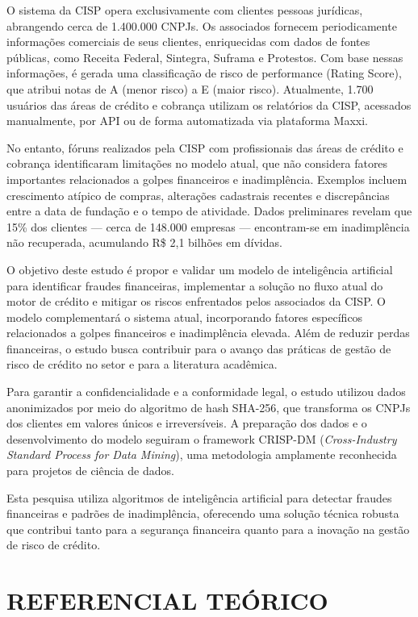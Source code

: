 \documentclass[12pt,a4paper]{article}
\begin{document}
O sistema da CISP opera exclusivamente com clientes pessoas jurídicas, abrangendo cerca de 1.400.000 CNPJs. Os associados fornecem periodicamente informações comerciais de seus clientes, enriquecidas com dados de fontes públicas, como Receita Federal, Sintegra, Suframa e Protestos. Com base nessas informações, é gerada uma classificação de risco de performance (Rating Score), que atribui notas de A (menor risco) a E (maior risco). Atualmente, 1.700 usuários das áreas de crédito e cobrança utilizam os relatórios da CISP, acessados manualmente, por API ou de forma automatizada via plataforma Maxxi.

No entanto, fóruns realizados pela CISP com profissionais das áreas de crédito e cobrança identificaram limitações no modelo atual, que não considera fatores importantes relacionados a golpes financeiros e inadimplência. Exemplos incluem crescimento atípico de compras, alterações cadastrais recentes e discrepâncias entre a data de fundação e o tempo de atividade. Dados preliminares revelam que 15\% dos clientes — cerca de 148.000 empresas — encontram-se em inadimplência não recuperada, acumulando R\$ 2,1 bilhões em dívidas.

O objetivo deste estudo é propor e validar um modelo de inteligência artificial para identificar fraudes financeiras, implementar a solução no fluxo atual do motor de crédito e mitigar os riscos enfrentados pelos associados da CISP. O modelo complementará o sistema atual, incorporando fatores específicos relacionados a golpes financeiros e inadimplência elevada. Além de reduzir perdas financeiras, o estudo busca contribuir para o avanço das práticas de gestão de risco de crédito no setor e para a literatura acadêmica.

Para garantir a confidencialidade e a conformidade legal, o estudo utilizou dados anonimizados por meio do algoritmo de hash SHA-256, que transforma os CNPJs dos clientes em valores únicos e irreversíveis. A preparação dos dados e o desenvolvimento do modelo seguiram o framework CRISP-DM (\textit{Cross-Industry Standard Process for Data Mining}), uma metodologia amplamente reconhecida para projetos de ciência de dados.

Esta pesquisa utiliza algoritmos de inteligência artificial para detectar fraudes financeiras e padrões de inadimplência, oferecendo uma solução técnica robusta que contribui tanto para a segurança financeira quanto para a inovação na gestão de risco de crédito.

\newpage
\section{REFERENCIAL TEÓRICO}
\label{sec:referencial}
\end{document}
